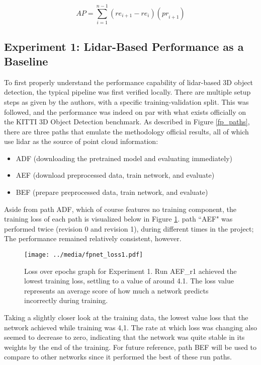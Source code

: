 \begin{equation}
AP = \sum^{n-1}_{i=1} ({re}_{i+1}-{re}_{i})({pr}_{i+1})
\label{eq_ap}
\end{equation}

\subsection{Experiment 1: Lidar-Based Performance as a Baseline}

To first properly understand the performance capability of lidar-based 3D object detection, the typical pipeline was first verified locally. There are multiple setup steps as given by the authors, with a specific training-validation split. This was followed, and the performance was indeed on par with what exists officially on the KITTI 3D Object Detection benchmark. As described in Figure \ref{fp_paths}, there are three paths that emulate the methodology official results, all of which use lidar as the source of point cloud information: 

\begin{itemize} \itemsep=-0.5em
	\item ADF (downloading the pretrained model and evaluating immediately)
	\item AEF (download preprocessed data, train network, and evaluate)
	\item BEF (prepare preprocessed data, train network, and evaluate)
\end{itemize}

Aside from path ADF, which of course features no training component, the training loss of each path is visualized below in Figure \ref{fpnet_loss1}. path ``AEF" was performed twice (revision 0 and revision 1), during different times in the project; The performance remained relatively consistent, however.

\begin{figure}[H]
	\centering
	\texttt{[image: ../media/fpnet\_loss1.pdf]}
	\caption{Loss over epochs graph for Experiment 1. Run AEF\_r1 achieved the lowest training loss, settling to a value of around 4.1. The loss value represents an average score of how much a network predicts incorrectly during training.}
	\label{fpnet_loss1}
\end{figure}

Taking a slightly closer look at the training data, the lowest value loss that the network achieved while training was 4,1. The rate at which loss was changing also seemed to decrease to zero, indicating that the network was quite stable in its weights by the end of the training. For future reference, path BEF will be used to compare to other networks since it performed the best of these run paths.

